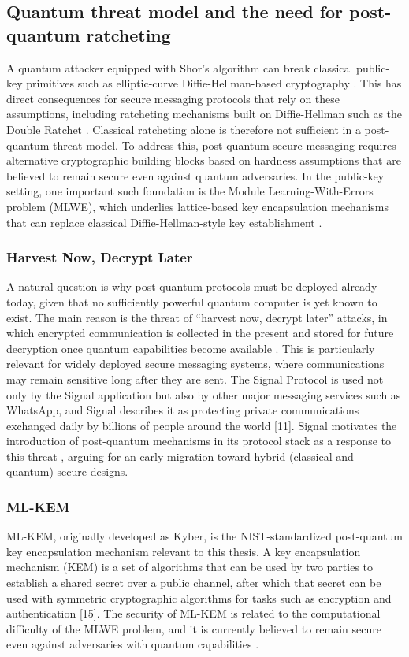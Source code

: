 \subsection{Quantum threat model and the need for post-quantum ratcheting}
A quantum attacker equipped with Shor’s algorithm can break classical public-key primitives such as elliptic-curve Diffie-Hellman-based cryptography \cite{ref16}. This has direct consequences for secure messaging protocols that rely on these assumptions, including ratcheting mechanisms built on Diffie-Hellman such as the Double Ratchet \cite{ref16}. Classical ratcheting alone is therefore not sufficient in a post-quantum threat model. To address this, post-quantum secure messaging requires alternative cryptographic building blocks based on hardness assumptions that are believed to remain secure even against quantum adversaries. In the public-key setting, one important such foundation is the Module Learning-With-Errors problem (MLWE), which underlies lattice-based key encapsulation mechanisms that can replace classical Diffie-Hellman-style key establishment \cite{ref15}. 

\subsubsection{Harvest Now, Decrypt Later}
A natural question is why post-quantum protocols must be deployed already today, given that no sufficiently powerful quantum computer is yet known to exist. The main reason is the threat of “harvest now, decrypt later” attacks, in which encrypted communication is collected in the present and stored for future decryption once quantum capabilities become available \cite{ref16}. This is particularly relevant for widely deployed secure messaging systems, where communications may remain sensitive long after they are sent. The Signal Protocol is used not only by the Signal application but also by other major messaging services such as WhatsApp, and Signal describes it as protecting private communications exchanged daily by billions of people around the world [11]. Signal motivates the introduction of post-quantum mechanisms in its protocol stack as a response to this threat \cite{ref07}, arguing for an early migration toward hybrid (classical and quantum) secure designs.  

\subsubsection{ML-KEM}
ML-KEM, originally developed as Kyber, is the NIST-standardized post-quantum key encapsulation mechanism relevant to this thesis. A key encapsulation mechanism (KEM) is a set of algorithms that can be used by two parties to establish a shared secret over a public channel, after which that secret can be used with symmetric cryptographic algorithms for tasks such as encryption and authentication [15]. The security of ML-KEM is related to the computational difficulty of the MLWE problem, and it is currently believed to remain secure even against adversaries with quantum capabilities \cite{ref15}. 

